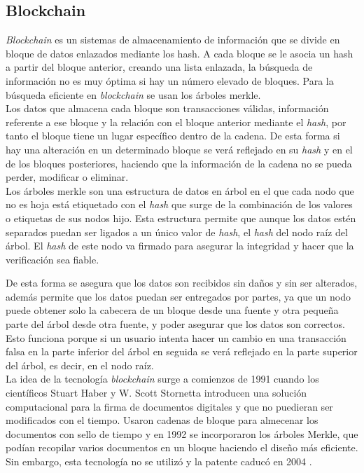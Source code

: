 \subsection{Blockchain}\label{sec:intro:blockchain}


\textit{Blockchain} es un sistemas de almacenamiento de información que se divide en bloque de datos enlazados mediante los hash. A cada bloque se le asocia un hash a partir del bloque anterior, creando una lista enlazada, la búsqueda de información no es muy óptima si hay un número elevado de bloques. Para la búsqueda eficiente en \textit{blockchain} se usan los árboles merkle.\\

Los datos que almacena cada bloque son transacciones válidas, información referente a ese bloque y la relación con el bloque anterior mediante el \textit{hash}, por tanto el bloque tiene un lugar específico dentro de la cadena. De esta forma si hay una alteración en un determinado bloque se verá reflejado en su \textit{hash} y en el de los bloques posteriores, haciendo que la información de la cadena no se pueda perder, modificar o eliminar.\\


Los árboles merkle \cite{arbol-merkle} son una estructura de datos en árbol en el que cada nodo que no es hoja está etiquetado con el \textit{hash} que surge de la combinación de los valores o etiquetas de sus nodos hijo. Esta estructura permite que aunque los datos estén separados puedan ser ligados a un único valor de \textit{hash}, el \textit{hash} del nodo raíz del árbol. El \textit{hash} de este nodo va firmado para asegurar la integridad y hacer que la verificación sea fiable. 

De esta forma se asegura que los datos son recibidos sin daños y sin ser alterados, además permite que los datos puedan ser entregados por partes, ya que un nodo puede obtener solo la cabecera de un bloque desde una fuente y otra pequeña parte del árbol desde otra fuente, y poder asegurar que los datos son correctos. Esto funciona porque si un usuario intenta hacer un cambio en una transacción falsa en la parte inferior del árbol en seguida se verá reflejado en la parte superior del árbol, es decir, en el nodo raíz.\\

La idea de la tecnología \textit{blockchain} surge a comienzos de 1991 cuando los científicos Stuart Haber y W. Scott Stornetta introducen una solución computacional para la firma de documentos digitales y que no puedieran ser modificados con el tiempo. Usaron cadenas de bloque para almecenar los documentos con sello de tiempo y en 1992 se incorporaron los árboles Merkle, que podían recopilar varios documentos en un bloque haciendo el diseño más eficiente. Sin embargo, esta tecnología no se utilizó y la patente caducó en 2004 \cite{historia1-block}.

